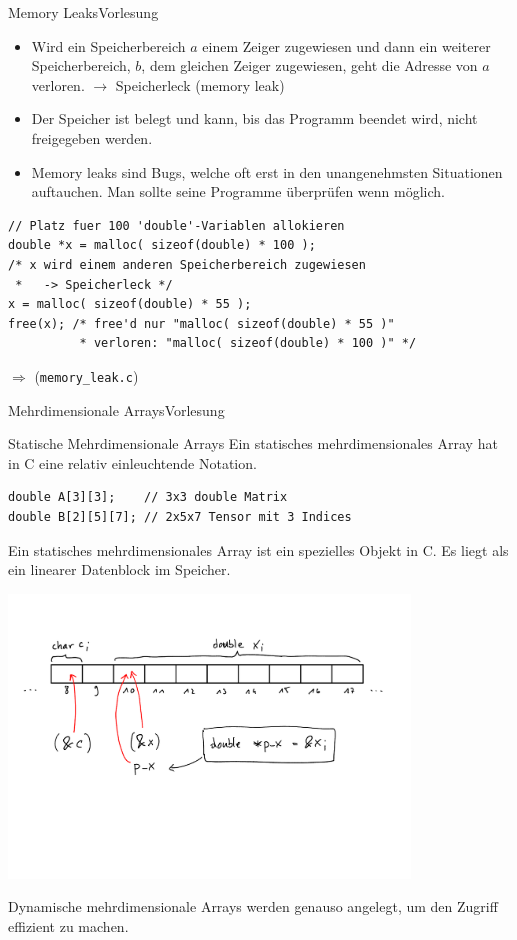 \documentclass[xcolor=dvipsnames]{beamer}
\newcounter{lecturecounter}
\begin{document}
\begin{frame}[fragile]{Memory Leaks}{Vorlesung }
\begin{block}{}
  \begin{itemize}
    \item{Wird ein Speicherbereich $a$ einem Zeiger zugewiesen und dann ein weiterer Speicherbereich, $b$, dem gleichen Zeiger zugewiesen, geht die Adresse von $a$ verloren. $\rightarrow$ Speicherleck (memory leak)}
    \item{Der Speicher ist belegt und kann, bis das Programm beendet wird, nicht freigegeben werden.}
    \item{Memory leaks sind Bugs, welche oft erst in den unangenehmsten Situationen auftauchen. Man sollte seine Programme überprüfen wenn möglich.}
  \end{itemize}
\end{block}
\begin{lstlisting}
// Platz fuer 100 'double'-Variablen allokieren
double *x = malloc( sizeof(double) * 100 );
/* x wird einem anderen Speicherbereich zugewiesen
 *   -> Speicherleck */
x = malloc( sizeof(double) * 55 );
free(x); /* free'd nur "malloc( sizeof(double) * 55 )"
          * verloren: "malloc( sizeof(double) * 100 )" */
\end{lstlisting}
$\Rightarrow$ (\verb|memory_leak.c|)
\end{frame}

\begin{frame}[fragile]{Mehrdimensionale Arrays}{Vorlesung }
\begin{block}{Statische Mehrdimensionale Arrays}
  Ein statisches mehrdimensionales Array hat in C eine relativ einleuchtende Notation.
\end{block}
\begin{lstlisting}
double A[3][3];    // 3x3 double Matrix
double B[2][5][7]; // 2x5x7 Tensor mit 3 Indices
\end{lstlisting}
\begin{block}{}
  Ein statisches mehrdimensionales Array ist ein spezielles Objekt in C. Es liegt als ein linearer Datenblock im Speicher.  
\end{block}
\centering
\includegraphics[page=4,width=0.8\textwidth,clip=true,trim=0 12cm 0 2cm]{graphics/c_kurs_tafel}
\begin{block}{}
  Dynamische mehrdimensionale Arrays werden genauso angelegt, um den Zugriff effizient zu machen.
\end{block}
\end{frame}
\end{document}

